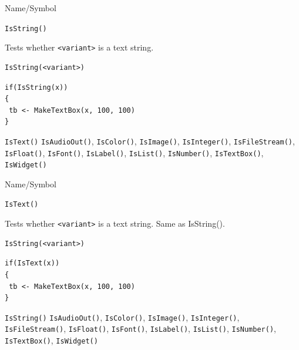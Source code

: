\begin{desc}{Name/Symbol}
\item[Name/Symbol]	\verb+IsString()+

\item[Description]	Tests whether \verb+<variant>+ is a text string.

\item[Usage]		
\begin{verbatim}
IsString(<variant>)
\end{verbatim}

\item[Example]	
\begin{verbatim}
if(IsString(x))
{
 tb <- MakeTextBox(x, 100, 100)
}
\end{verbatim}

\item[See Also] \verb+IsText()+	\verb+IsAudioOut()+, \verb+IsColor()+, \verb+IsImage()+, \verb+IsInteger()+, 
		\verb+IsFileStream()+, \verb+IsFloat()+, \verb+IsFont()+, \verb+IsLabel()+,
		\verb+IsList()+, \verb+IsNumber()+, \verb+IsTextBox()+, \verb+IsWidget()+
\end{desc}

\begin{desc}{Name/Symbol}
\item[Name/Symbol]	\verb+IsText()+

\item[Description]	Tests whether \verb+<variant>+ is a text string.
  Same as IsString().

\item[Usage]		
\begin{verbatim}
IsString(<variant>)
\end{verbatim}

\item[Example]	
\begin{verbatim}
if(IsText(x))
{
 tb <- MakeTextBox(x, 100, 100)
}
\end{verbatim}

\item[See Also] \verb+IsString()+	\verb+IsAudioOut()+, \verb+IsColor()+, \verb+IsImage()+, \verb+IsInteger()+, 
		\verb+IsFileStream()+, \verb+IsFloat()+, \verb+IsFont()+, \verb+IsLabel()+,
		\verb+IsList()+, \verb+IsNumber()+, \verb+IsTextBox()+, \verb+IsWidget()+
\end{desc}


